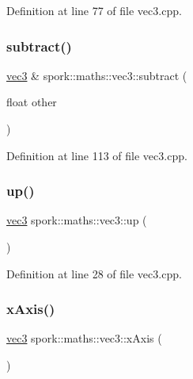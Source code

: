 Definition at line 77 of file vec3.\+cpp.

\mbox{\label{structspork_1_1maths_1_1vec3_a4200a71e3a63aad760cfa425f0d7de8a}} 
\subsubsection{\texorpdfstring{subtract()}{subtract()}\hspace{0.1cm}{\footnotesize\ttfamily [2/2]}}
{\footnotesize\ttfamily \hyperlink{structspork_1_1maths_1_1vec3}{vec3} \& spork\+::maths\+::vec3\+::subtract (\begin{DoxyParamCaption}\item[{float}]{other }\end{DoxyParamCaption})}



Definition at line 113 of file vec3.\+cpp.

\mbox{\label{structspork_1_1maths_1_1vec3_abc666e8d44e5e295c74e93c75c358c16}} 
\subsubsection{\texorpdfstring{up()}{up()}}
{\footnotesize\ttfamily \hyperlink{structspork_1_1maths_1_1vec3}{vec3} spork\+::maths\+::vec3\+::up (\begin{DoxyParamCaption}{ }\end{DoxyParamCaption})\hspace{0.3cm}{\ttfamily [static]}}



Definition at line 28 of file vec3.\+cpp.

\mbox{\label{structspork_1_1maths_1_1vec3_a236424fe30d86a98406e46e4f26289a0}} 
\subsubsection{\texorpdfstring{x\+Axis()}{xAxis()}}
{\footnotesize\ttfamily \hyperlink{structspork_1_1maths_1_1vec3}{vec3} spork\+::maths\+::vec3\+::x\+Axis (\begin{DoxyParamCaption}{ }\end{DoxyParamCaption})\hspace{0.3cm}{\ttfamily [static]}}



